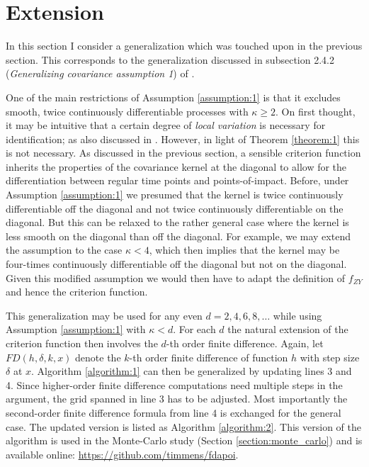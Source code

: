 \section{Extension}
\label{section:extension}

In this section I consider a generalization which was touched upon in the previous
section. This corresponds to the generalization discussed in subsection 2.4.2
(\emph{Generalizing covariance assumption 1}) of \cite{Kneip2020}.

One of the main restrictions of Assumption \ref{assumption:1} is that it excludes
smooth, twice continuously differentiable processes with $\kappa \geq 2$. On first
thought, it may be intuitive that a certain degree of \emph{local variation} is
necessary for identification; as also discussed in \cite{Kneip2016}. However, in light
of Theorem \ref{theorem:1} this is not necessary. As discussed in the previous section,
a sensible criterion function inherits the properties of the covariance kernel at the
diagonal to allow for the differentiation between regular time points and
points-of-impact.  Before, under Assumption \ref{assumption:1} we presumed that the
kernel is twice continuously differentiable off the diagonal and not twice continuously
differentiable on the diagonal. But this can be relaxed to the rather general case where
the kernel is less smooth on the diagonal than off the diagonal. For example, we may
extend the assumption to the case $\kappa < 4$, which then implies that the kernel may
be four-times continuously differentiable off the diagonal but not on the diagonal.
Given this modified assumption we would then have to adapt the definition of $f_{ZY}$
and hence the criterion function.

This generalization may be used for any even $d = 2, 4, 6, 8, \dots$ while using
Assumption \ref{assumption:1} with $\kappa < d$. For each $d$ the natural extension of
the criterion function then involves the $d$-th order finite difference. Again, let
$FD(h, \delta, k, x)$ denote the $k$-th order finite difference of function $h$ with
step size $\delta$ at $x$. Algorithm \ref{algorithm:1} can then be generalized by
updating lines 3 and 4.  Since higher-order finite difference computations need multiple
steps in the argument, the grid spanned in line 3 has to be adjusted. Most importantly
the second-order finite difference formula from line 4 is exchanged for the general
case. The updated version is listed as Algorithm \ref{algorithm:2}. This version of the
algorithm is used in the Monte-Carlo study (Section \ref{section:monte_carlo}) and is
available online: \url{https://github.com/timmens/fdapoi}.

